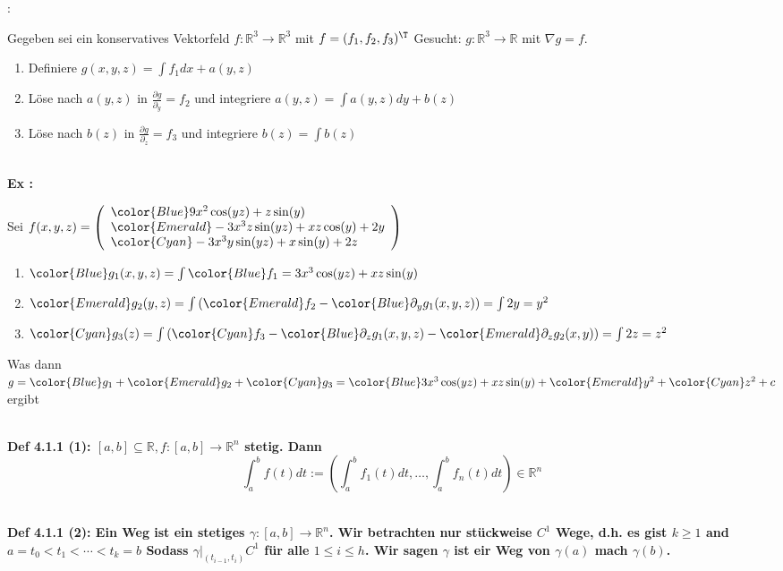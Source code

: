 \documentclass[7pt,landscape, margin = 0.1mm]{article}
\newcommand{\KRZ}[2]{\vspace{1mm} \hline \vspace{1mm} \color{chaptercolor}{RC #1}:\color{black} \   \hspace{0.2cm}\vspace{1mm}   {\begin{minipage}{20em}
#2 \end{minipage}} \vspace{1mm}  \hline \vspace{1mm}  \\}
\newcommand{\DEF}[2]{\color{chaptercolor}\bf{Def #1}:\color{black}    \hspace{0.2cm} #2 \\}
\newcommand{\EX}[2]{\color{chaptercolor}\bf{Ex #1}:\color{black}    \hspace{0.2cm} #2 \\}
\begin{document}
\begin{multicols}{4}
\begin{flushleft}
\KRZ{Potential}{
Gegeben sei ein konservatives Vektorfeld $f:\mathbb{R}^3 \rightarrow \mathbb{R}^3$ mit $f=(f_1, f_2,f_3)^\T$
Gesucht: $g: \mathbb{R}^3 \rightarrow \mathbb{R}$ mit $\nabla g=f$.

\begin{enumerate}
\item Definiere $g(x,y,z) = \int f_1 dx + a(y,z)$
\item Löse nach $a(y,z)$ in $\frac{\partial g}{\partial_y}=f_2$ und integriere $ a(y,z) = \int a(y,z) dy + b(z)$
\item Löse nach $b(z)$ in $\frac{\partial g}{\partial_z}=f_3$ und integriere $ b(z) = \int b(z)$
\end{enumerate}


}

\EX{}{

Sei $f(x, y, z)=\left(\begin{array}{l}
{\color{Blue} 9 x^2 \cos (y z)+z \sin (y)} \\
{\color{Emerald}-3 x^3 z \sin (y z)+x z \cos (y)+2 y} \\
{\color{Cyan}-3 x^3 y \sin (y z)+x \sin (y)+2 z}
\end{array}\right)$

\begin{enumerate}
\item ${\color{Blue}g_1(x, y, z)}=\int {\color{Blue}f_1 =3 x^3 \cos (y z)+x z \sin (y)} $
\item ${\color{Emerald}g_2 (y,z)} = \int \left({\color{Emerald}f_2}- { \color{Blue} \partial_y g_1(x,y,z)}\right) = \int 2y= y^2$
\item ${\color{Cyan}g_3 (z)} = \int \left({\color{Cyan}f_3}- {\color{Blue} \partial_zg_1(x,y,z)} - {\color{Emerald}\partial_z g_2(x,y)}\right) = \int 2z= z^2$
\end{enumerate}
Was dann $g={\color{Blue}g_1} + {\color{Emerald}g_2} + {\color{Cyan}g_3} = {\color{Blue}3 x^3 \cos (y z)+x z \sin (y)}+{\color{Emerald}y^2}+{\color{Cyan}z^2}+c$ ergibt

}

\DEF{4.1.1 (1)}{ $[a, b] \subseteq \mathbb{R}, f:[a, b] \rightarrow \mathbb{R}^n$ stetig.
Dann $$\int_a^b f(t) d t:=\left(\int_a^b f_1(t) d t, \ldots, \int_a^b f_n(t) d t\right) \in \mathbb{R}^n$$


}

\DEF{4.1.1 (2)}{Ein Weg ist ein stetiges $\gamma:[a, b] \rightarrow \mathbb{R}^n$. Wir betrachten nur stückweise $C^1$ Wege, d.h. es gist $k \geqslant 1$ and $a=t_0<t_1<\cdots<t_k=b$ Sodass $\left.\gamma\right|_{ \left( t_{i-1},t_{i}\right) } C^1$ für alle $1 \leq i \leq h$. Wir sagen $\gamma$ ist eir Weg von $\gamma(a)$ mach $\gamma(b)$.}


\end{flushleft}
\end{multicols}
\end{document}
